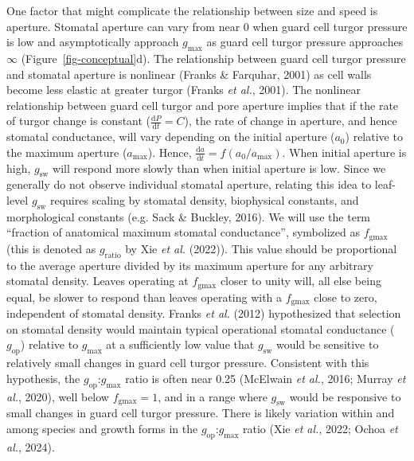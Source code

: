 \documentclass[
  letterpaper,
  DIV=11,
  numbers=noendperiod]{scrartcl}
\newcommand{\fgmax}{$f_\mathrm{gmax}$}
\newcommand{\gmax}{$g_\mathrm{max}$}
\newcommand{\gop}{$g_\mathrm{op}$}
\newcommand{\gsw}{$g_\mathrm{sw}$}
\newcommand{\dv}[2]{\frac{\mathrm{d}#1}{\mathrm{d}#2}}
\begin{document}
One factor that might complicate the relationship between size and speed
is aperture. Stomatal aperture can vary from near 0 when guard cell
turgor pressure is low and asymptotically approach \gmax{} as guard cell
turgor pressure approaches \(\infty\) (Figure~\ref{fig-conceptual}d).
The relationship between guard cell turgor pressure and stomatal
aperture is nonlinear (Franks \& Farquhar, 2001) as cell walls become
less elastic at greater turgor (Franks \emph{et al.}, 2001). The
nonlinear relationship between guard cell turgor and pore aperture
implies that if the rate of turgor change is constant
(\(\dv{P}{t} = C\)), the rate of change in aperture, and hence stomatal
conductance, will vary depending on the initial aperture (\(a_0\))
relative to the maximum aperture (\(a_\mathrm{max}\)). Hence,
\(\dv{a}{t} = f(a_0 / a_\mathrm{max})\). When initial aperture is high,
\gsw{} will respond more slowly than when initial aperture is low. Since
we generally do not observe individual stomatal aperture, relating this
idea to leaf-level \gsw{} requires scaling by stomatal density,
biophysical constants, and morphological constants (e.g. Sack \&
Buckley, 2016). We will use the term ``fraction of anatomical maximum
stomatal conductance'', symbolized as \fgmax{} (this is denoted as
\(g_\mathrm{ratio}\) by Xie \emph{et al.} (2022)). This value should be
proportional to the average aperture divided by its maximum aperture for
any arbitrary stomatal density. Leaves operating at \fgmax{} closer to
unity will, all else being equal, be slower to respond than leaves
operating with a \fgmax{} close to zero, independent of stomatal
density. Franks \emph{et al.} (2012) hypothesized that selection on
stomatal density would maintain typical operational stomatal conductance
(\gop) relative to \gmax{} at a sufficiently low value that \gsw{} would
be sensitive to relatively small changes in guard cell turgor pressure.
Consistent with this hypothesis, the \gop:\gmax{} ratio is often near
0.25 (McElwain \emph{et al.}, 2016; Murray \emph{et al.}, 2020), well
below \(f_\mathrm{gmax} = 1\), and in a range where \gsw{} would be
responsive to small changes in guard cell turgor pressure. There is
likely variation within and among species and growth forms in the
\gop:\gmax{} ratio (Xie \emph{et al.}, 2022; Ochoa \emph{et al.}, 2024).
\end{document}
